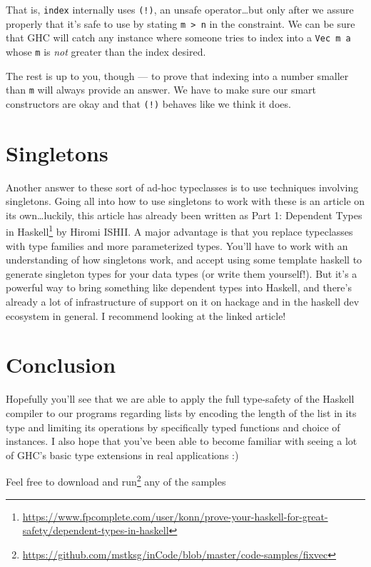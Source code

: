 \documentclass[]{article}
\renewcommand{\href}[2]{#2\footnote{\url{#1}}}
\begin{document}
That is, \texttt{index} internally uses \texttt{(!)}, an unsafe
operator\ldots but only after we assure properly that it's safe to use by
stating \texttt{m\ \textgreater{}\ n} in the constraint. We can be sure that GHC
will catch any instance where someone tries to index into a \texttt{Vec\ m\ a}
whose \texttt{m} is \emph{not} greater than the index desired.

The rest is up to you, though --- to prove that indexing into a number smaller
than \texttt{m} will always provide an answer. We have to make sure our smart
constructors are okay and that \texttt{(!)} behaves like we think it does.

\hypertarget{singletons}{%
\section{Singletons}\label{singletons}}

Another answer to these sort of ad-hoc typeclasses is to use techniques
involving singletons. Going all into how to use singletons to work with these is
an article on its own\ldots luckily, this article has already been written as
\href{https://www.fpcomplete.com/user/konn/prove-your-haskell-for-great-safety/dependent-types-in-haskell}{Part
1: Dependent Types in Haskell} by Hiromi ISHII. A major advantage is that you
replace typeclasses with type families and more parameterized types. You'll have
to work with an understanding of how singletons work, and accept using some
template haskell to generate singleton types for your data types (or write them
yourself!). But it's a powerful way to bring something like dependent types into
Haskell, and there's already a lot of infrastructure of support on it on hackage
and in the haskell dev ecosystem in general. I recommend looking at the linked
article!

\hypertarget{conclusion}{%
\section{Conclusion}\label{conclusion}}

Hopefully you'll see that we are able to apply the full type-safety of the
Haskell compiler to our programs regarding lists by encoding the length of the
list in its type and limiting its operations by specifically typed functions and
choice of instances. I also hope that you've been able to become familiar with
seeing a lot of GHC's basic type extensions in real applications :)

Feel free to
\href{https://github.com/mstksg/inCode/blob/master/code-samples/fixvec}{download
and run} any of the samples
\end{document}
